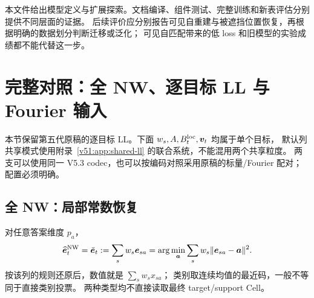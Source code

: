 \documentclass[11pt,UTF8,fontset=fandol]{ctexart}
\numberwithin{equation}{section}
\theoremstyle{definition}
\begin{document}
本文件给出模型定义与扩展探索。文档编译、组件测试、完整训练和新表评估分别提供不同层面的证据。
后续评价应分别报告可见自重建与被遮挡位置恢复，再根据明确的数据划分判断迁移或泛化；
可见自匹配带来的低 loss 和旧模型的实验成绩都不能代替这一步。


\section{完整对照：全 NW、逐目标 LL 与 Fourier 输入}
\label{v51:app:target-baseline}
本节保留第五代原稿的逐目标 LL。下面 $w_s,A,B_t^{\rm loc},\bm v_t$ 均属于单个目标，
默认列共享模式使用附录~\ref{v51:app:shared-ll} 的联合系统，不能混用两个共享粒度。
两支可以使用同一 V5.3 codec，也可以按编码对照采用原稿的标量/Fourier 配对；配置必须明确。
\subsection{全 NW：局部常数恢复}
对任意答案维度 $p_a$，
\begin{equation}
 \widehat{\bm e}_t^{\rm NW}=\bar{\bm e}_t:=\sum_s w_s\bm e_{sa}
 =\arg\min_{\bm a}\sum_s w_s\|\bm e_{sa}-\bm a\|^2.
 \label{eq:R:encoded-nw}
\end{equation}\begingroup\makeatletter\protected@edef\@currentlabel{\p@equation\theequation}\label{front:eq:encoded-nw}\endgroup
按该列的规则还原后，数值就是 $\sum_s w_s x_{sa}$；
类别取连续均值的最近码，一般不等同于直接类别投票。
两种类型均不直接读取最终 target/support Cell。
\end{document}

